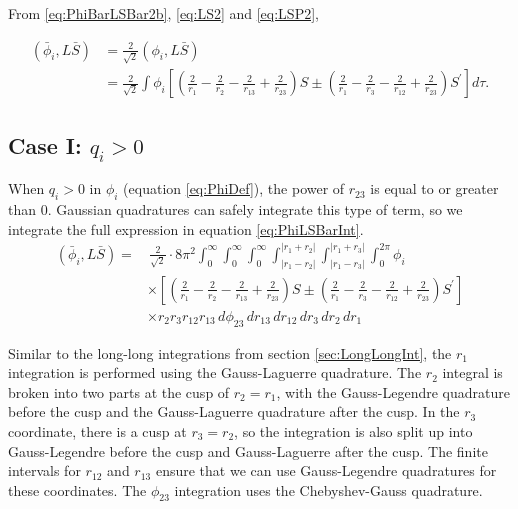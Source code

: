 \documentclass[Dissertation.tex]{subfiles}
\begin{document}
From \ref{eq:PhiBarLSBar2b}, \ref{eq:LS2} and \ref{eq:LSP2}, 

\begin{align}
\label{eq:PhiLSBarInt}
\nonumber (\bar{\phi}_i, L\bar{S}) &= \frac{2}{\sqrt{2}} \left(\phi_i,L\bar{S}\right) \\
 &= \frac{2}{\sqrt{2}} \int \phi_i \left[ \left( \frac{2}{r_1} - \frac{2}{r_2} - \frac{2}{r_{13}} + \frac{2}{r_{23}} \right)S \pm \left( \frac{2}{r_1} - \frac{2}{r_3} - \frac{2}{r_{12}} + \frac{2}{r_{23}} \right) S^\prime \right]  d\tau.
\end{align}

\subsection{Case I: \texorpdfstring{$q_i > 0$}{qi > 0}}
\label{sec:Swaveqigt0}
When $q_i > 0$ in $\phi_i$ (equation \ref{eq:PhiDef}), the power of $r_{23}$ is equal to or greater than 0.  Gaussian quadratures can safely integrate this type of term, so we integrate the full expression in equation \ref{eq:PhiLSBarInt}.
\begin{align}
\label{eq:PhiLSBarIntFull}
\nonumber (\bar{\phi}_i, L\bar{S}) =& \, \frac{2}{\sqrt{2}} \cdot 8\pi^2  \int_0^\infty \int_0^\infty \int_0^\infty \int_{|r_1 - r_2|}^{|r_1 + r_2|} \int_{|r_1 - r_3|}^{|r_1 + r_3|} \int_0^{2\pi} \phi_i \\
&\times \left[ \left( \frac{2}{r_1} - \frac{2}{r_2} - \frac{2}{r_{13}} + \frac{2}{r_{23}} \right)S \pm \left( \frac{2}{r_1} - \frac{2}{r_3} - \frac{2}{r_{12}} + \frac{2}{r_{23}} \right) S^\prime \right] \\
&\times r_2 r_3 r_{12} r_{13}\, d\phi_{23}\, dr_{13}\, dr_{12}\, dr_3\, dr_2\, dr_1
\end{align}

Similar to the long-long integrations from section \ref{sec:LongLongInt}, the $r_1$ integration is performed using the Gauss-Laguerre quadrature.  The $r_2$ integral is broken into two parts at the cusp of $r_2 = r_1$, with the Gauss-Legendre quadrature before the cusp and the Gauss-Laguerre quadrature after the cusp.  In the $r_3$ coordinate, there is a cusp at $r_3 = r_2$, so the integration is also split up into Gauss-Legendre before the cusp and Gauss-Laguerre after the cusp.  The finite intervals for $r_{12}$ and $r_{13}$ ensure that we can use Gauss-Legendre quadratures for these coordinates.  The $\phi_{23}$ integration uses the Chebyshev-Gauss quadrature.
\end{document}

